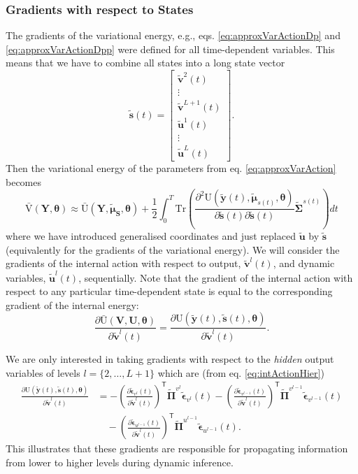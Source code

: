 \documentclass[a4paper,10pt]{article}
\newcommand{\bs}[1]{\mathbf{#1}}					%
\newcommand{\bgs}[1]{\boldsymbol{#1}}				%
\newcommand{\pd}[2]{\frac{\partial #1}{\partial #2}} 	%
\newcommand{\ppd}[3]{\frac{\partial^2 #1}{\partial #2 \partial #3}} %
\newcommand{\tr}{\mathsf{T}}				%
\newcommand{\eq}[1]{\begin{equation} #1 \end{equation}}%
\newcommand{\trace}[1]{\mathrm{Tr}\left(#1\right)}					%
\newcommand{\gc}[1]{\tilde{#1}} %
\renewcommand{\ss}{u}         %
\newcommand{\sv}{v}         %
\newcommand{\so}{y}         %
\newcommand{\st}{s}         %
\newcommand{\spe}{\epsilon} %
\renewcommand{\sp}{\theta}    %
\newcommand{\ps}{\bs{\ss}}    %
\newcommand{\pv}{\bs{\sv}}    %
\newcommand{\po}{\bs{\so}}    %
\newcommand{\pt}{\bs{\st}}     %
\newcommand{\ppe}{\bgs{\spe}} %
\newcommand{\psg}{\gc{\ps}}    %
\newcommand{\pvg}{\gc{\pv}}    %
\newcommand{\ptg}{\gc{\pt}}     %
\newcommand{\pog}{\gc{\po}}    %
\newcommand{\ppeg}{\gc{\ppe}} %
\newcommand{\pp}{\bgs{\sp}} %
\newcommand{\Ps}{\bs{U}}    %
\newcommand{\Po}{\bs{Y}}    %
\newcommand{\Pv}{\bs{V}}    %
\newcommand{\Pt}{\bs{S}}    %
\newcommand{\U}{\mathrm{U}}			%
\newcommand{\Ua}{\bar{\mathrm{U}}}		%
\newcommand{\Va}{\bar{\mathrm{V}}}		%
\newcommand{\Cov}{\bgs{\Sigma}}			%
\begin{document}
\subsubsection{Gradients with respect to States}
The gradients of the variational energy, e.g., eqs. \eqref{eq:approxVarActionDp} and \eqref{eq:approxVarActionDpp} were defined for all time-dependent variables. This means that we have to combine all states into a long state vector
\eq{
    \ptg(t) = \left[\begin{array}{c}
                     \pvg^2(t)\\
                     \vdots\\
                     \pvg^{L+1}(t)\\
                     \psg^1(t)\\
                     \vdots\\
                     \psg^L(t)
\end{array}\right].
}
Then the variational energy of the parameters from eq. \eqref{eq:approxVarAction} becomes
\eq{
    \Va(\Po,\pp) \approx \Ua(\Po,\gc{\bgs{\mu}}_\Pt,\pp) + \frac{1}{2}\int_0^T \trace{\ppd{\U(\pog(t),\gc{\bgs{\mu}}_{\st(t)},\pp)}{\ptg(t)}{\ptg(t)}\gc{\Cov}^{\st(t)}}dt
}
where we have introduced generalised coordinates and just replaced $\psg$ by $\ptg$ (equivalently for the gradients of the variational energy). We will consider the gradients of the internal action with respect to output, $\pvg^l(t)$, and dynamic variables, $\psg^l(t)$, sequentially. Note that the gradient of the internal action with respect to any particular time-dependent state is equal to the corresponding gradient of the internal energy:
\eq{
    \pd{\Ua(\Pv,\Ps,\pp)}{\pvg^l(t)} = \pd{\U(\pog(t),\ptg(t),\pp)}{\pvg^l(t)}.
}

We are only interested in taking gradients with respect to the \emph{hidden} output variables of levels $l=\{2, \dots, L+1\}$ which are (from eq. \ref{eq:intActionHier})
\begin{align}
    \pd{\U(\pog(t),\ptg(t),\pp)}{\pvg^l(t)} &=  - \left(\pd{\ppeg_{\sv^{l}}(t)}{\pvg^l(t)}\right)^\tr\gc{\bgs{\Pi}}^{\sv^{l}}\ppeg_{\sv^{l}}(t) - \left(\pd{\ppeg_{\sv^{l-1}}(t)}{\pvg^l(t)}\right)^\tr\gc{\bgs{\Pi}}^{\sv^{l-1}}\ppeg_{\sv^{l-1}}(t) \nonumber\\
    &\quad - \left(\pd{\ppeg_{\ss^{l-1}}(t)}{\pvg^l(t)}\right)^\tr\gc{\bgs{\Pi}}^{\ss^{l-1}}\ppeg_{\ss^{l-1}}(t).
\end{align}
This illustrates that these gradients are responsible for propagating information from lower to higher levels during dynamic inference. 
\end{document}
